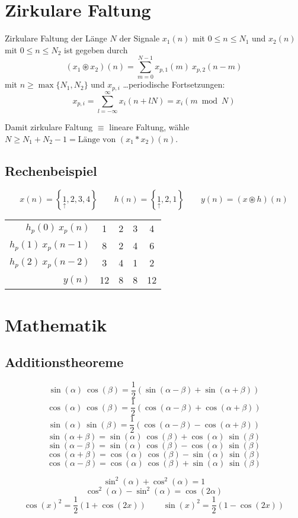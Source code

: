 \documentclass[10pt,a4paper]{article}
\begin{document}
\section*{Zirkulare Faltung}
Zirkulare Faltung der Länge $N$ der Signale $x_1(n)$ mit $0 \leq n \leq N_1$ und $x_2(n)$ mit $0 \leq n \leq N_2$ ist gegeben durch
\[
	(x_1 \circledast x_2)(n) = \sum_{m = 0}^{N - 1} x_{p, 1}(m) ~ x_{p, 2}(n - m)
\]
mit $n \geq \max \{ N_1, N_2 \}$ und $x_{p, i}$ \ldots periodische Fortsetzungen:
\[
	x_{p, i} = \sum_{l = -\infty}^\infty x_i(n + lN) = x_i(m \bmod N)
\]

Damit zirkulare Faltung $\equiv$ lineare Faltung, wähle $N \geq N_1 + N_2 - 1 = \text{Länge von $(x_1 * x_2)(n)$}$.

\subsection*{Rechenbeispiel}
\[
	x(n) = \left \{ \underset{\uparrow}{1}, 2, 3, 4 \right \} \qquad h(n) = \left \{ \underset{\uparrow}{1}, 2, 1 \right \} \qquad y(n) = (x \circledast h)(n)
\]

\begin{center}
	\begin{tabular}{r | c c c c}
		$h_p(0) ~ x_p(n)$ & 1 & 2 & 3 & 4 \\
		$h_p(1) ~ x_p(n - 1)$ & 8 & 2 & 4 & 6 \\
		$h_p(2) ~ x_p(n - 2)$ & 3 & 4 & 1 & 2 \\ \hline
		$y(n)$ & 12 & 8 & 8 & 12
	\end{tabular}
\end{center}

\section*{Mathematik}
\subsection*{Additionstheoreme}
\begin{multicols}{2}
	\[ \sin(\alpha) ~ \cos(\beta) = \frac{1}{2} (\sin(\alpha - \beta) + \sin(\alpha + \beta)) \]
	\[ \cos(\alpha) ~ \cos(\beta) = \frac{1}{2} (\cos(\alpha - \beta) + \cos(\alpha + \beta)) \]
	\[ \sin(\alpha) ~ \sin(\beta) = \frac{1}{2} (\cos(\alpha - \beta) - \cos(\alpha + \beta)) \]
	\vspace{0.5pt}
	\[ \sin(\alpha + \beta) = \sin(\alpha) ~ \cos(\beta) + \cos(\alpha) ~ \sin(\beta) \]
	\[ \sin(\alpha - \beta) = \sin(\alpha) ~ \cos(\beta) - \cos(\alpha) ~ \sin(\beta) \]
	\[ \cos(\alpha + \beta) = \cos(\alpha) ~ \cos(\beta) - \sin(\alpha) ~ \sin(\beta) \]
	\[ \cos(\alpha - \beta) = \cos(\alpha) ~ \cos(\beta) + \sin(\alpha) ~ \sin(\beta) \]
\end{multicols}
\vspace{0.5pt}
\[ \sin^2(\alpha) + \cos^2(\alpha) = 1 \]
\[ \cos^2(\alpha) - \sin^2(\alpha) = \cos(2\alpha) \]
\[ \cos(x)^2 = \frac{1}{2} \left(1 + \cos(2x) \right) \qquad \sin(x)^2 = \frac{1}{2} \left(1 - \cos(2x) \right) \]
\end{document}
